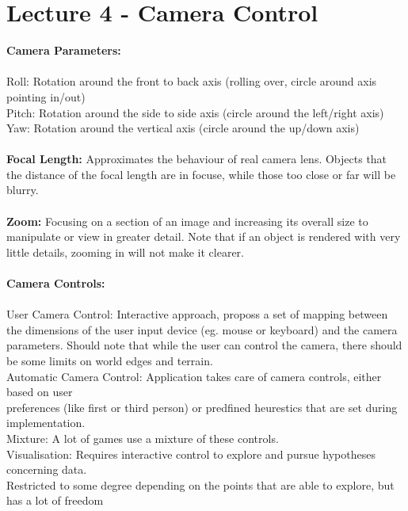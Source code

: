\documentclass[a4paper,10pt]{article}
\begin{document}
\section* {Lecture 4 - Camera Control }
\noindent \textcolor{Emerald}{\textbf{Camera Parameters:}} \\\\
\indent \textcolor{Emerald}{Roll:} Rotation around the front to back axis (rolling over, circle around axis pointing in/out)\\ 
\indent \textcolor{Emerald}{Pitch:} Rotation around the side to side axis (circle around the left/right axis)\\ 
\indent \textcolor{Emerald}{Yaw:} Rotation around the vertical axis (circle around the up/down axis) \\ \\
\noindent \textcolor{Emerald}{\textbf{Focal Length:}} Approximates the behaviour of real camera lens. Objects that the distance of the focal length are in focuse, while those too close or far will be blurry.\\\\
\noindent \textcolor{Emerald}{\textbf{Zoom:}} Focusing on a section of an image and increasing its overall size to manipulate or view in greater detail. Note that if an object is rendered with very little details, zooming in will not make it clearer. \\\\
\noindent \textcolor{Emerald}{\textbf{Camera Controls:}} \\ \\
\indent \textcolor{Emerald}{User Camera Control:} Interactive approach, proposs a set of mapping between the dimensions of \indent the user input device (eg. mouse or keyboard) and the camera parameters. Should note that while \indent the user can control the camera, there should be some limits on world edges and terrain. \\
\indent \textcolor{Emerald}{Automatic Camera Control:} Application takes care of camera controls, either based on user \\
\indent preferences (like first or third person) or predfined heurestics that are set during implementation. \\
\indent \textcolor{Emerald}{Mixture:} A lot of games use a mixture of these controls.  \\
\indent \textcolor{Emerald}{Visualisation:} Requires interactive control to explore and pursue hypotheses concerning data. \\ \indent Restricted to some degree depending on the points that are able to explore, but has a lot of freedom \\
\end{document}
